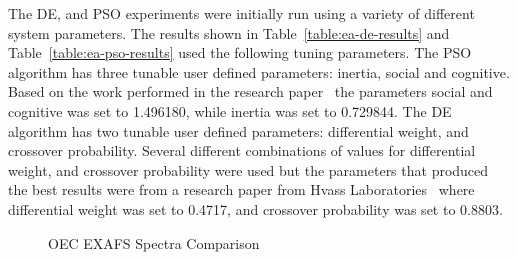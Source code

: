 The DE, and PSO experiments were initially run using a variety of different system parameters. The results shown in Table~\ref{table:ea-de-results} and Table~\ref{table:ea-pso-results} used the following tuning parameters. The PSO algorithm has three tunable user defined parameters: inertia, social and cognitive. Based on the work performed in the research paper~\cite{eberhart2000comparing} the parameters social and cognitive was set to 1.496180, while inertia was set to 0.729844. The DE algorithm has two tunable user defined parameters: differential weight, and crossover probability. Several different combinations of values for differential weight, and crossover probability were used but the parameters that produced the best results were from a research paper from Hvass Laboratories~\cite{pedersen2010good} where differential weight was set to 0.4717, and crossover probability was set to 0.8803.

\begin{figure*}
	\centering
	\caption{OEC EXAFS Spectra Comparison}
	\label{fig:bestRunEXAFS}
\end{figure*}